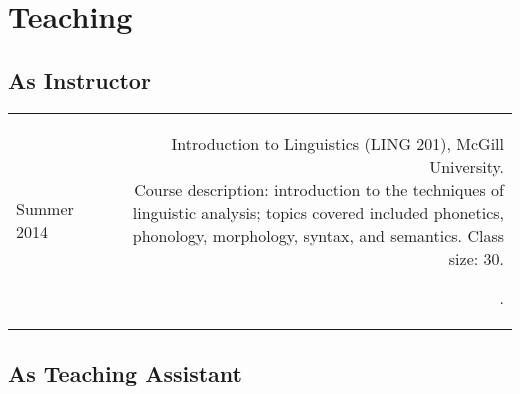 \documentclass[11pt,letterpaper,twoside]{article}
\makeatletter
\newcommand{\bodywidth}{0.76}
\newenvironment{cvsection}{%
  \setlength{\extrarowheight}{0.70ex}
  \begin{longtable}[l]{@{} L R @{}}
}{%
  \end{longtable}
}
\newcommand{\course}[3]{%
  \parbox[t]{\bodywidth\textwidth}{#1.\\ {\footnotesize Course description: #2.
      Class size: #3.}}
}
\makeatother
\begin{document}
\section*{Teaching}

\subsection*{As Instructor}

\begin{cvsection}
  Summer 2014 & \course{Introduction to Linguistics (LING 201), McGill University}
  {introduction to the techniques of linguistic analysis; topics covered included phonetics, phonology, morphology, syntax, and semantics}
  {30}.
\end{cvsection}

\subsection*{As Teaching Assistant}
\end{document}
